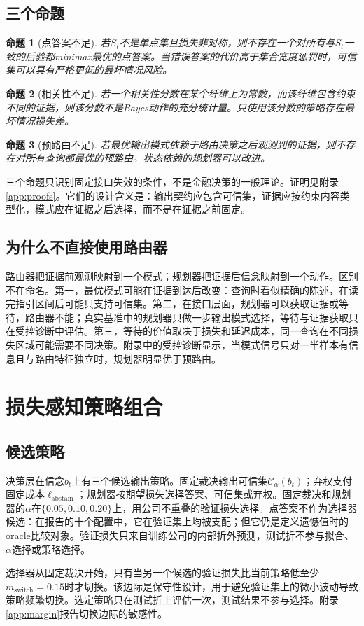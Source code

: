 \documentclass[12pt,openany]{ctexbook}
\newtheorem{proposition}{命题}[chapter]
\begin{document}
\section{三个命题}
\begin{proposition}[点答案不足]
若$S_t$不是单点集且损失非对称，则不存在一个对所有与$S_t$一致的后验都minimax最优的点答案。当错误答案的代价高于集合宽度惩罚时，可信集可以具有严格更低的最坏情况风险。
\end{proposition}
\begin{proposition}[相关性不足]
若一个相关性分数在某个纤维上为常数，而该纤维包含约束不同的证据，则该分数不是Bayes动作的充分统计量。只使用该分数的策略存在最坏情况损失差。
\end{proposition}
\begin{proposition}[预路由不足]
若最优输出模式依赖于路由决策之后观测到的证据，则不存在对所有查询都最优的预路由。状态依赖的规划器可以改进。
\end{proposition}
三个命题只识别固定接口失效的条件，不是金融决策的一般理论。证明见附录\ref{app:proofs}。它们的设计含义是：输出契约应包含可信集，证据应按约束内容类型化，模式应在证据之后选择，而不是在证据之前固定。\par

\section{为什么不直接使用路由器}
路由器把证据前观测映射到一个模式；规划器把证据后信念映射到一个动作。区别不在命名。第一，最优模式可能在证据到达后改变：查询时看似精确的陈述，在读完指引区间后可能只支持可信集。第二，在接口层面，规划器可以获取证据或等待，路由器不能；真实基准中的规划器只做一步输出模式选择，等待与证据获取只在受控诊断中评估。第三，等待的价值取决于损失和延迟成本，同一查询在不同损失区域可能需要不同决策。附录中的受控诊断显示，当模式信号只对一半样本有信息且与路由特征独立时，规划器明显优于预路由。\par

\chapter{损失感知策略组合}
\label{ch:method}

\section{候选策略}
决策层在信念$b_t$上有三个候选输出策略。固定裁决输出可信集$\mathcal{C}_\alpha(b_t)$；弃权支付固定成本$\ell_{\text{abstain}}$；规划器按期望损失选择答案、可信集或弃权。固定裁决和规划器的$\alpha$在$\{0.05,0.10,0.20\}$上，用公司不重叠的验证损失选择。点答案不作为选择器候选：在报告的十个配置中，它在验证集上均被支配；但它仍是定义遗憾值时的oracle比较对象。验证损失只来自训练公司的内部折外预测，测试折不参与拟合、$\alpha$选择或策略选择。\par
选择器从固定裁决开始，只有当另一个候选的验证损失比当前策略低至少$m_{\text{switch}}=0.15$时才切换。该边际是保守性设计，用于避免验证集上的微小波动导致策略频繁切换。选定策略只在测试折上评估一次，测试结果不参与选择。附录\ref{app:margin}报告切换边际的敏感性。\par
\end{document}
